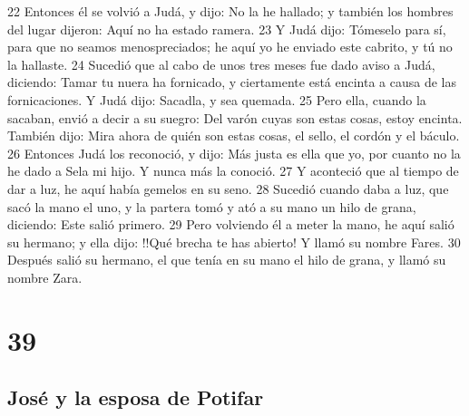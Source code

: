 22 Entonces él se volvió a Judá, y dijo: No la he hallado; y también los hombres del lugar dijeron: Aquí no ha estado ramera.
23 Y Judá dijo: Tómeselo para sí, para que no seamos menospreciados; he aquí yo he enviado este cabrito, y tú no la hallaste.
24 Sucedió que al cabo de unos tres meses fue dado aviso a Judá, diciendo: Tamar tu nuera ha fornicado, y ciertamente está encinta a causa de las fornicaciones. Y Judá dijo: Sacadla, y sea quemada.
25 Pero ella, cuando la sacaban, envió a decir a su suegro: Del varón cuyas son estas cosas, estoy encinta. También dijo: Mira ahora de quién son estas cosas, el sello, el cordón y el báculo.
26 Entonces Judá los reconoció, y dijo: Más justa es ella que yo, por cuanto no la he dado a Sela mi hijo. Y nunca más la conoció.
27 Y aconteció que al tiempo de dar a luz, he aquí había gemelos en su seno.
28 Sucedió cuando daba a luz, que sacó la mano el uno, y la partera tomó y ató a su mano un hilo de grana, diciendo: Este salió primero.
29 Pero volviendo él a meter la mano, he aquí salió su hermano; y ella dijo: !!Qué brecha te has abierto! Y llamó su nombre Fares.
30 Después salió su hermano, el que tenía en su mano el hilo de grana, y llamó su nombre Zara.

\chapter{39}

\section{José y la esposa de Potifar}

